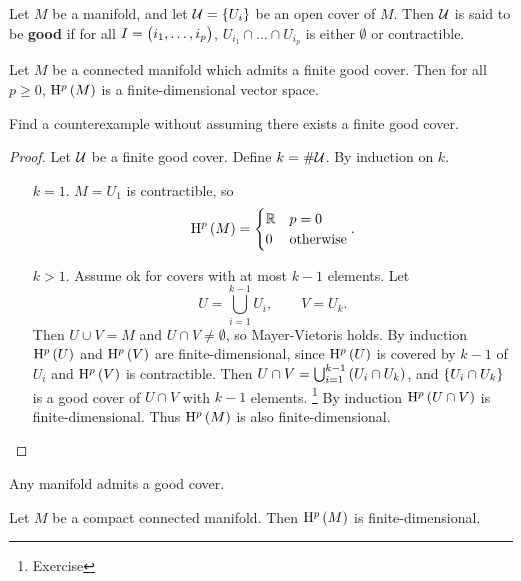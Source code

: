 \begin{definition}
Let $ M $ be a manifold, and let $ \UUU = \cbr{U_i} $ be an open cover of $ M $. Then $ \mathcal{U} $ is said to be \textbf{good} if for all $ I = \br{i_1, \dots, i_p} $, $ U_{i_1} \cap \dots \cap U_{i_p} $ is either $ \emptyset $ or contractible.
\end{definition}

\begin{lemma}
\label{lem:2.35}
Let $ M $ be a connected manifold which admits a finite good cover. Then for all $ p \ge 0 $, $ \H^p\br{M} $ is a finite-dimensional vector space.
\end{lemma}

\begin{exercise*}
Find a counterexample without assuming there exists a finite good cover.
\end{exercise*}

\begin{proof}
Let $ \mathcal{U} $ be a finite good cover. Define $ k = \#\mathcal{U} $. By induction on $ k $.
\begin{itemize}[leftmargin=0.5in]
\item[$ k = 1 $.] $ M = U_1 $ is contractible, so
$$ \H^p\br{M} =
\begin{cases}
\RR & p = 0 \\
0 & \text{otherwise}
\end{cases}.
$$
\item[$ k > 1 $.] Assume ok for covers with at most $ k - 1 $ elements. Let
$$ U = \bigcup_{i = 1}^{k - 1} U_i, \qquad V = U_k. $$
Then $ U \cup V = M $ and $ U \cap V \ne \emptyset $, so Mayer-Vietoris holds. By induction $ \H^p\br{U} $ and $ \H^p\br{V} $ are finite-dimensional, since $ \H^p\br{U} $ is covered by $ k - 1 $ of $ U_i $ and $ \H^p\br{V} $ is contractible. Then $ U \cap V = \bigcup_{i = 1}^{k - 1} \br{U_i \cap U_k} $, and $ \cbr{U_i \cap U_k} $ is a good cover of $ U \cap V $ with $ k - 1 $ elements. \footnote{Exercise} By induction $ \H^p\br{U \cap V} $ is finite-dimensional. Thus $ \H^p\br{M} $ is also finite-dimensional.
\end{itemize}
\end{proof}

\pagebreak

\begin{fact*}
Any manifold admits a good cover.
\end{fact*}

\begin{theorem}
Let $ M $ be a compact connected manifold. Then $ \H^p\br{M} $ is finite-dimensional.
\end{theorem}

